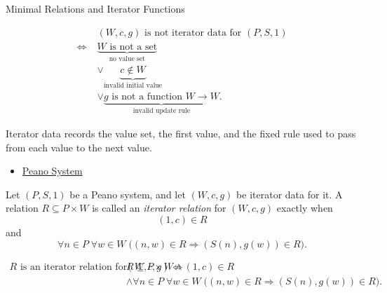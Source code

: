 \begin{topicbox}{Minimal Relations and Iterator Functions}
\begin{remark*}
\[
\begin{aligned}
&(W,c,g) \text{ is not iterator data for } (P,S,1)\\
\Longleftrightarrow\;&
\underbrace{W \text{ is not a set}}_{\text{no value set}}\\
&\lor \underbrace{c\notin W}_{\text{invalid initial value}}\\
&\lor \underbrace{g \text{ is not a function } W\to W}_{\text{invalid update rule}}.
\end{aligned}
\]
\end{remark*}

\begin{remark*}[Interpretation]
Iterator data records the value set, the first value, and the fixed rule used
to pass from each value to the next value.
\end{remark*}

\begin{remark*}[Dependencies]
\begin{itemize}
  \item \hyperref[def:peano-system]{Peano System}
\end{itemize}
\end{remark*}

\begin{tcolorbox}[colback=defbox, colframe=defborder, arc=2pt,
  left=6pt, right=6pt, top=4pt, bottom=4pt,
  title={\small\textbf{Definition (Iterator Relation)}},
  fonttitle=\small\bfseries]
\begin{definition}
\label{def:iterator-relation}
Let $(P,S,1)$ be a Peano system, and let $(W,c,g)$ be iterator data for it. A
relation $R\subseteq P\times W$ is called an \emph{iterator relation} for
$(W,c,g)$ exactly when
\[
(1,c)\in R
\]
and
\[
\forall n\in P\;\forall w\in W\;
\bigl((n,w)\in R\Longrightarrow (S(n),g(w))\in R\bigr).
\]
\end{definition}
\end{tcolorbox}

\begin{remark*}
\[
\begin{aligned}
R \text{ is an iterator relation for } (W,c,g)
\Longleftrightarrow\;&
R\subseteq P\times W
\land (1,c)\in R\\
&\land
\forall n\in P\;\forall w\in W\;
\bigl((n,w)\in R\Longrightarrow (S(n),g(w))\in R\bigr).
\end{aligned}
\]
\end{remark*}


\end{topicbox}
